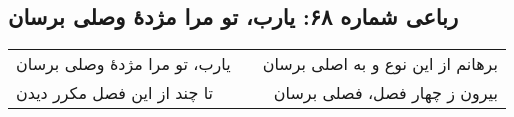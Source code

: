 \begin{center}
\section*{رباعی شماره ۶۸: یارب، تو مرا مژدهٔ وصلی برسان}
\label{sec:068}
\begin{longtable}{l p{0.5cm} r}
یارب، تو مرا مژدهٔ وصلی برسان
&&
برهانم از این نوع و به اصلی برسان
\\
تا چند از این فصل مکرر دیدن
&&
بیرون ز چهار فصل، فصلی برسان
\\
\end{longtable}
\end{center}
